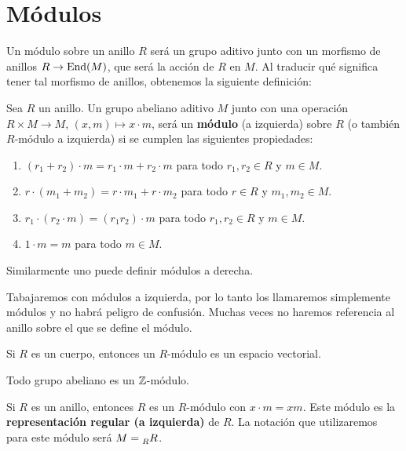 \chapter{Módulos}
\label{modulos}

Un módulo sobre un anillo $R$ será un grupo aditivo junto con un morfismo
de anillos $R\to\operatorname{End}(M)$, que será la acción de $R$ en $M$. Al traducir
qué significa tener tal morfismo de anillos, obtenemos la siguiente definición:

\begin{definition}
Sea $R$ un anillo. Un grupo abeliano aditivo $M$ junto con una operación
$R\times M\to M$, $(x,m)\mapsto x\cdot m$, 
será un \textbf{módulo} (a izquierda) sobre $R$ (o también $R$-módulo a izquierda) si
se cumplen las siguientes propiedades:
\begin{enumerate}
\item $(r_1+r_2)\cdot m=r_1\cdot m+r_2\cdot m$ para todo $r_1,r_2\in R$ y $m\in M$.
\item $r\cdot (m_1+m_2)=r\cdot m_1+r\cdot m_2$ para todo $r\in R$ y $m_1,m_2\in M$.
\item $r_1\cdot (r_2\cdot m)=(r_1r_2)\cdot m$ para todo $r_1,r_2\in R$ y $m\in M$.
\item $1\cdot m=m$ para todo $m\in M$.	
\end{enumerate}
\end{definition}

Similarmente uno puede definir módulos a derecha. 

Tabajaremos con módulos a izquierda, por lo tanto los llamaremos simplemente módulos y no habrá peligro de confusión.  Muchas veces no haremos referencia al anillo
sobre el que se define el módulo.

\begin{example}
Si $R$ es un cuerpo, entonces un $R$-módulo 	es un espacio vectorial. 
\end{example}

\begin{example}
Todo grupo abeliano es un $\mathbb{Z}$-módulo.	
\end{example}

\begin{example}
Si $R$ es un anillo, entonces $R$ es un $R$-módulo con $x\cdot m=xm$. 
Este módulo es la \textbf{representación regular (a izquierda)} de $R$.  
La notación que utilizaremos para este módulo será $M=\prescript{}{R}R$. 
\end{example}

